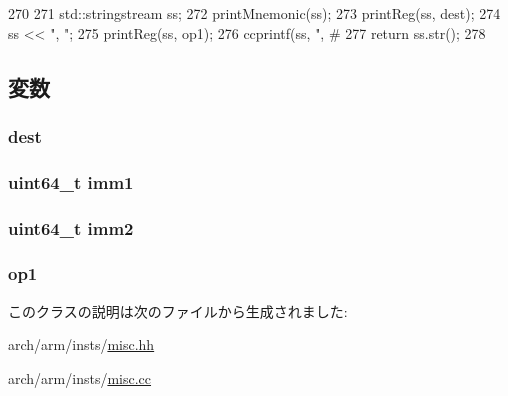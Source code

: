 \begin{DoxyCode}
270 {
271     std::stringstream ss;
272     printMnemonic(ss);
273     printReg(ss, dest);
274     ss << ", ";
275     printReg(ss, op1);
276     ccprintf(ss, ", #%
277     return ss.str();
278 }
\end{DoxyCode}


\subsection{変数}
\hypertarget{classRegRegImmImmOp_aec72e8e45bdc87abeeeb75d2a8a9a716}{
\subsubsection[{dest}]{ {\bf dest}}}
\label{classRegRegImmImmOp_aec72e8e45bdc87abeeeb75d2a8a9a716}
\hypertarget{classRegRegImmImmOp_a846a1153344f66cc5d7c5af6fc071bb4}{
\subsubsection[{imm1}]{\setlength{\rightskip}{0pt plus 5cm}uint64\_\-t {\bf imm1}}}
\label{classRegRegImmImmOp_a846a1153344f66cc5d7c5af6fc071bb4}
\hypertarget{classRegRegImmImmOp_a4b3bca3d7461f9d143e9bcd456390a27}{
\subsubsection[{imm2}]{\setlength{\rightskip}{0pt plus 5cm}uint64\_\-t {\bf imm2}}}
\label{classRegRegImmImmOp_a4b3bca3d7461f9d143e9bcd456390a27}
\hypertarget{classRegRegImmImmOp_a4c465c43ad568f8bcf8ae71480e9cfea}{
\subsubsection[{op1}]{ {\bf op1}}}
\label{classRegRegImmImmOp_a4c465c43ad568f8bcf8ae71480e9cfea}


このクラスの説明は次のファイルから生成されました:\begin{DoxyCompactItemize}
\item 
arch/arm/insts/\hyperlink{arch_2arm_2insts_2misc_8hh}{misc.hh}\item 
arch/arm/insts/\hyperlink{arch_2arm_2insts_2misc_8cc}{misc.cc}\end{DoxyCompactItemize}
